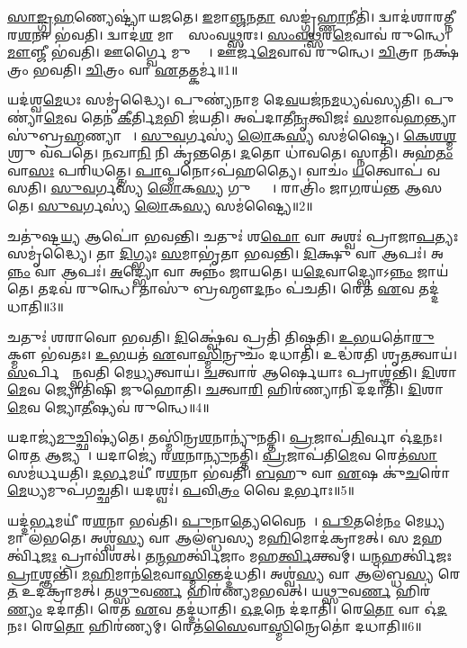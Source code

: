 \ul{𑌸𑌾}\ul{𑌙𑍍𑌗𑍍𑌰}\ul{𑌹}𑌣𑍍𑌯𑍇𑌷𑍍𑌟𑍍𑌯𑌾॑ 𑌯𑌜𑌤𑍇।
\ul{𑌇}𑌮𑌾\ul{𑌞𑍍𑌜}𑌨\ul{𑌤𑌾}\ul{} 𑌸𑌙𑍍𑌗𑍃॑\ul{𑌹𑍍𑌣𑌾}𑌨𑍀𑌤𑌿॑।
𑌦𑍍𑌵𑌾𑌦॑𑌶𑌾𑌰𑌤𑍍𑌨𑍀 𑌰\ul{𑌶}𑌨𑌾 𑌭॑𑌵𑌤𑌿।
𑌦𑍍𑌵𑌾𑌦॑\ul{𑌶} 𑌮𑌾𑌸𑌾𑌃᳚ 𑌸𑌂𑌵\ul{𑌥𑍍𑌸}𑌰𑌃।
\ul{𑌸𑌂}\ul{𑌵}\ul{𑌥𑍍𑌸}𑌰\ul{𑌮𑍇}𑌵𑌾𑌵॑ 𑌰𑍁𑌨𑍍𑌧𑍇।
\ul{𑌮𑍗}𑌞𑍍𑌜𑍀 𑌭॑𑌵𑌤𑌿।
𑌊𑌰𑍍𑌗𑍍𑌵𑍈 𑌮𑍁𑌞𑍍𑌜𑌾𑌃᳚।
𑌊𑌰𑍍𑌜॑\ul{𑌮𑍇}𑌵𑌾𑌵॑ 𑌰𑍁𑌨𑍍𑌧𑍇।
\ul{𑌚𑌿}𑌤𑍍𑌰𑌾 𑌨𑌕𑍍𑌷॑𑌤𑍍𑌰𑌂 𑌭𑌵𑌤𑌿।
\ul{𑌚𑌿}𑌤𑍍𑌰𑌂 𑌵𑌾 \ul{𑌏}𑌤𑌤𑍍𑌕𑌰𑍍𑌮॑॥1॥

𑌯𑌦॑𑌶𑍍𑌵\ul{𑌮𑍇}𑌧𑌃 𑌸𑌮𑍃॑𑌦𑍍𑌧𑍍𑌯𑍈।
𑌪𑍁𑌣𑍍𑌯॑𑌨𑌾𑌮 𑌦𑍇\ul{𑌵}𑌯𑌜॑𑌨\ul{𑌮}𑌧𑍍𑌯𑌵॑𑌸𑍍𑌯𑌤𑌿।
𑌪𑍁𑌣𑍍𑌯𑌾॑\ul{𑌮𑍇}𑌵 𑌤𑍇𑌨॑ \ul{𑌕𑍀}𑌰𑍍𑌤𑌿\ul{𑌮}𑌭𑌿 𑌜॑𑌯𑌤𑌿।
𑌅𑌪॑𑌦𑌾𑌤𑍀\ul{𑌨𑍃}𑌤𑍍𑌵𑌿𑌜𑌃॑ \ul{𑌸}𑌮𑌾𑌵॑\ul{𑌹}𑌨𑍍𑌤𑍍𑌯𑌾 𑌸𑍁॑𑌬𑍍𑌰\ul{𑌹𑍍𑌮}𑌣𑍍𑌯𑌾𑌯𑌾𑌃᳚।
\ul{𑌸𑍁}\ul{𑌵}𑌰𑍍𑌗𑌸𑍍𑌯॑ \ul{𑌲𑍋}𑌕\ul{𑌸𑍍𑌯} 𑌸𑌮॑𑌷𑍍𑌟𑍍𑌯𑍈।
\ul{𑌕𑍇}\ul{𑌶}\ul{𑌶𑍍𑌮}𑌶𑍍𑌰𑍁 𑌵॑𑌪𑌤𑍇।
\ul{𑌨}𑌖𑌾\ul{𑌨𑌿} 𑌨𑌿 𑌕𑍃॑𑌨𑍍𑌤𑌤𑍇।
\ul{𑌦}𑌤𑍋 𑌧𑌾॑𑌵𑌤𑍇।
𑌸𑍍𑌨𑌾𑌤𑌿॑।
𑌅𑌹॑\ul{𑌤𑌂} 𑌵𑌾\ul{𑌸𑌃} 𑌪𑌰𑌿॑𑌧𑌤𑍍𑌤𑍇।
\ul{𑌪𑌾}𑌪𑍍𑌮𑌨𑍋\-𑌽𑌪॑𑌹𑌤𑍍𑌯𑍈।
𑌵𑌾𑌚𑌂॑ \ul{𑌯}𑌤𑍍𑌵𑍋𑌪॑ 𑌵𑌸𑌤𑌿।
\ul{𑌸𑍁}\ul{𑌵}𑌰𑍍𑌗𑌸𑍍𑌯॑ \ul{𑌲𑍋}𑌕\ul{𑌸𑍍𑌯} 𑌗𑍁𑌪𑍍𑌤𑍍𑌯𑍈᳚।
𑌰𑌾𑌤𑍍𑌰𑌿𑌂॑ 𑌜𑌾\ul{𑌗}𑌰𑌯॑𑌨𑍍𑌤 𑌆𑌸𑌤𑍇।
\ul{𑌸𑍁}\ul{𑌵}𑌰𑍍𑌗𑌸𑍍𑌯॑ \ul{𑌲𑍋}𑌕\ul{𑌸𑍍𑌯} 𑌸𑌮॑𑌷𑍍𑌟𑍍𑌯𑍈॥2॥\anuvakamend[𑌕𑌰𑍍𑌮॑ 𑌧\ul{𑌤𑍍𑌤𑍇} 𑌪𑌞𑍍𑌚॑ 𑌚]

𑌚𑌤𑍁॑𑌷𑍍𑌟\ul{𑌯𑍍𑌯} 𑌆𑌪𑍋॑ 𑌭𑌵𑌨𑍍𑌤𑌿।
𑌚𑌤𑍁𑌃॑ 𑌶\ul{𑌫𑍋} 𑌵𑌾 𑌅𑌶𑍍𑌵𑌃॑ 𑌪𑍍𑌰𑌾𑌜𑌾\ul{𑌪}𑌤𑍍𑌯𑌃 𑌸𑌮𑍃॑𑌦𑍍𑌧𑍍𑌯𑍈।
𑌤𑌾 \ul{𑌦𑌿}𑌗𑍍𑌭𑍍𑌯𑌃 \ul{𑌸}𑌮𑌾𑌭𑍃॑𑌤𑌾 𑌭𑌵𑌨𑍍𑌤𑌿।
\ul{𑌦𑌿}𑌕𑍍𑌷𑍁 𑌵𑌾 𑌆𑌪𑌃॑।
𑌅\ul{𑌨𑍍𑌨𑌂} 𑌵𑌾 𑌆𑌪𑌃॑।
\ul{𑌅}𑌦𑍍𑌭𑍍𑌯𑍋 𑌵𑌾 𑌅𑌨𑍍𑌨𑌂॑ 𑌜𑌾𑌯𑌤𑍇।
𑌯\ul{𑌦𑍇}𑌵𑌾𑌦𑍍𑌭𑍍𑌯𑍋\-𑌽\ul{𑌨𑍍𑌨𑌂} 𑌜𑌾𑌯॑𑌤𑍇।
𑌤𑌦𑌵॑ 𑌰𑍁𑌨𑍍𑌧𑍇।
𑌤𑌾𑌸𑍁॑ 𑌬𑍍𑌰𑌹𑍍𑌮𑍗\ul{𑌦}𑌨𑌂 𑌪॑𑌚𑌤𑌿।
𑌰𑍇𑌤॑ \ul{𑌏}𑌵 𑌤𑌦𑍍𑌦॑𑌧𑌾𑌤𑌿॥3॥

𑌚𑌤𑍁𑌃॑ 𑌶𑌰𑌾𑌵𑍋 𑌭𑌵𑌤𑌿।
\ul{𑌦𑌿}𑌕𑍍𑌷𑍍𑌵𑍇॑𑌵 𑌪𑍍𑌰𑌤𑌿॑ 𑌤𑌿𑌷𑍍𑌠𑌤𑌿।
\ul{𑌉}\ul{𑌭}𑌯𑌤𑍋॑\ul{𑌰𑍁}𑌕𑍍𑌮𑍗 𑌭॑𑌵𑌤𑌃।
\ul{𑌉}\ul{𑌭}𑌯𑌤॑ \ul{𑌏}𑌵𑌾\ul{𑌸𑍍𑌮𑌿}𑌨𑍍𑌰𑍁𑌚𑌂॑ 𑌦𑌧𑌾𑌤𑌿।
𑌉𑌦𑍍𑌧॑𑌰𑌤𑌿 𑌶𑍃\ul{𑌤}𑌤𑍍𑌵𑌾𑌯॑।
\ul{𑌸}𑌰𑍍𑌪𑌿𑌷𑍍𑌵𑌾᳚𑌨𑍍𑌭𑌵𑌤𑌿 𑌮𑍇\ul{𑌧𑍍𑌯}𑌤𑍍𑌵𑌾𑌯॑।
\ul{𑌚}𑌤𑍍𑌵𑌾𑌰॑ 𑌆𑌰𑍍\mbox{}\ul{𑌷𑍇}𑌯𑌾𑌃 𑌪𑍍𑌰𑌾𑌶𑍍𑌞॑𑌨𑍍𑌤𑌿।
\ul{𑌦𑌿}𑌶𑌾\ul{𑌮𑍇}𑌵 𑌜𑍍𑌯𑍋𑌤𑌿॑𑌷𑌿 𑌜𑍁𑌹𑍋𑌤𑌿।
\ul{𑌚}𑌤𑍍𑌵𑌾\ul{𑌰𑌿} 𑌹𑌿𑌰॑𑌣𑍍𑌯𑌾𑌨𑌿 𑌦𑌦𑌾𑌤𑌿।
\ul{𑌦𑌿}𑌶𑌾\ul{𑌮𑍇}𑌵 𑌜𑍍𑌯𑍋\ul{𑌤𑍀}\ul{}𑌷𑍍𑌯𑌵॑ 𑌰𑍁𑌨𑍍𑌧𑍇॥4॥

𑌯𑌦𑌾𑌜𑍍𑌯॑\ul{𑌮𑍁}𑌚𑍍𑌛𑌿𑌷𑍍𑌯॑𑌤𑍇।
𑌤𑌸𑍍𑌮𑌿॑𑌨𑍍𑌰\ul{𑌶}𑌨𑌾𑌨𑍍𑌯𑍁॑𑌨𑌤𑍍𑌤𑌿।
\ul{𑌪𑍍𑌰}𑌜𑌾𑌪॑\ul{𑌤𑌿}𑌰𑍍𑌵𑌾 𑌓॑\ul{𑌦}𑌨𑌃।
𑌰𑍇\ul{𑌤} 𑌆𑌜𑍍𑌯𑌮𑍍᳚।
𑌯𑌦𑌾𑌜𑍍𑌯𑍇॑ 𑌰\ul{𑌶}𑌨𑌾\ul{𑌨𑍍𑌯𑍁}𑌨𑌤𑍍𑌤𑌿॑।
\ul{𑌪𑍍𑌰}𑌜𑌾𑌪॑𑌤𑌿\ul{𑌮𑍇}𑌵 𑌰𑍇𑌤॑\ul{𑌸𑌾} 𑌸𑌮॑𑌰𑍍𑌧𑌯𑌤𑌿।
\ul{𑌦}\ul{𑌰𑍍𑌭}𑌮𑌯𑍀॑ 𑌰\ul{𑌶}𑌨𑌾 𑌭॑𑌵𑌤𑌿।
\ul{𑌬}𑌹𑍁 𑌵𑌾 \ul{𑌏}𑌷 𑌕𑍁॑\ul{𑌚}𑌰𑍋॑ \ul{𑌮𑍇}𑌧𑍍𑌯𑌮𑍁𑌪॑𑌗𑌚𑍍𑌛𑌤𑌿।
𑌯𑌦𑌶𑍍𑌵𑌃॑।
\ul{𑌪}𑌵𑌿\ul{𑌤𑍍𑌰𑌂} 𑌵𑍈 \ul{𑌦}𑌰𑍍𑌭𑌾𑌃॥5॥

𑌯𑌦𑍍𑌦॑\ul{𑌰𑍍𑌭}𑌮𑌯𑍀॑ 𑌰\ul{𑌶}𑌨𑌾 𑌭𑌵॑𑌤𑌿।
\ul{𑌪𑍁}𑌨𑌾\ul{𑌤𑍍𑌯𑍇}𑌵𑍈𑌨𑌮𑍍᳚।
\ul{𑌪𑍂}𑌤𑌮𑍇॑\ul{𑌨𑌂} 𑌮𑍇\ul{𑌧𑍍𑌯}𑌮𑌾 𑌲॑𑌭𑌤𑍇।
𑌅𑌶𑍍𑌵॑\ul{𑌸𑍍𑌯} 𑌵𑌾 𑌆𑌲॑𑌬𑍍𑌧𑌸𑍍𑌯 𑌮\ul{𑌹𑌿}𑌮𑍋𑌦॑𑌕𑍍𑌰𑌾𑌮𑌤𑍍।
𑌸 \ul{𑌮}𑌹𑌰𑍍𑌤𑍍𑌵𑌿॑\ul{𑌜𑌃} 𑌪𑍍𑌰𑌾𑌵𑌿॑𑌶𑌤𑍍।
𑌤\ul{𑌨𑍍𑌮}𑌹𑌰𑍍𑌤𑍍𑌵𑌿॑𑌜𑌾𑌂 𑌮𑌹\ul{𑌰𑍍𑌤𑍍𑌵𑌿}𑌕𑍍𑌤𑍍𑌵𑌮𑍍।
𑌯\ul{𑌨𑍍𑌮}𑌹𑌰𑍍𑌤𑍍𑌵𑌿॑𑌜𑌃 \ul{𑌪𑍍𑌰𑌾}𑌶𑍍𑌞𑌨𑍍𑌤𑌿॑।
\ul{𑌮}\ul{𑌹𑌿}𑌮𑌾𑌨॑\ul{𑌮𑍇}𑌵𑌾\ul{𑌸𑍍𑌮𑌿}𑌨𑍍𑌤𑌦𑍍𑌦॑𑌧𑌤𑌿।
𑌅𑌶𑍍𑌵॑\ul{𑌸𑍍𑌯} 𑌵𑌾 𑌆𑌲॑𑌬𑍍𑌧\ul{𑌸𑍍𑌯} 𑌰𑍇\ul{𑌤} 𑌉𑌦॑𑌕𑍍𑌰𑌾𑌮𑌤𑍍।
𑌤\ul{𑌥𑍍𑌸𑍁}𑌵\ul{𑌰𑍍𑌣}\ul{} 𑌹𑌿𑌰॑𑌣𑍍𑌯𑌮𑌭𑌵𑌤𑍍।
𑌯\ul{𑌥𑍍𑌸𑍁}𑌵\ul{𑌰𑍍𑌣}\ul{} 𑌹𑌿𑌰॑\ul{𑌣𑍍𑌯𑌂} 𑌦𑌦𑌾॑𑌤𑌿।
𑌰𑍇𑌤॑ \ul{𑌏}𑌵 𑌤𑌦𑍍𑌦॑𑌧𑌾𑌤𑌿।
\ul{𑌓}\ul{𑌦}𑌨𑍇 𑌦॑𑌦𑌾𑌤𑌿।
𑌰𑍇\ul{𑌤𑍋} 𑌵𑌾 𑌓॑\ul{𑌦}𑌨𑌃।
𑌰𑍇\ul{𑌤𑍋} 𑌹𑌿𑌰॑𑌣𑍍𑌯𑌮𑍍।
𑌰𑍇𑌤॑\ul{𑌸𑍈}𑌵𑌾\ul{𑌸𑍍𑌮𑌿}𑌨𑍍𑌰𑍇𑌤𑍋॑ 𑌦𑌧𑌾𑌤𑌿॥6॥\anuvakamend[\ul{𑌦}\ul{𑌧𑌾}\ul{𑌤𑌿} \ul{𑌰𑍁}\ul{𑌨𑍍𑌧𑍇} \ul{𑌦}𑌰𑍍𑌭𑌾 𑌅॑𑌭\ul{𑌵}𑌥𑍍𑌷𑌟𑍍 𑌚॑]

